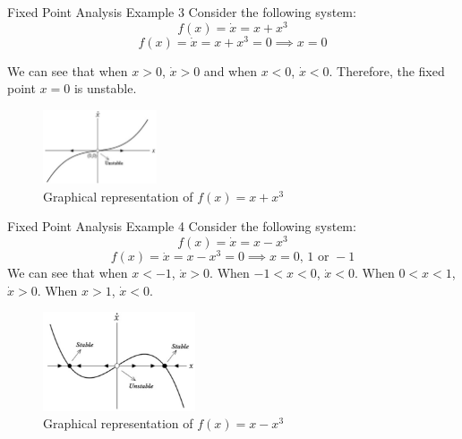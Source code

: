 \documentclass[18pt]{beamer}
\begin{document}
\begin{frame}{Fixed Point Analysis Example 3}
    Consider the following system:
    \[f(x) = \dot{x} = x + x^{3}\]
    \pause{}
    \[f(x) = \dot{x} = x + x^{3} = 0 \implies{x = 0}\]
    \pause{}

    We can see that when $x > 0$, $\dot{x} > 0$ and when $x < 0$, $\dot{x} < 0$. Therefore, the fixed point $x = 0$ is unstable.

    \begin{figure}[t]
        \centering
        \includegraphics[width=0.3\textwidth]{stability2}
        \caption{Graphical representation of $f(x) = x + x^{3}$}
    \end{figure}
\end{frame}

\begin{frame}{Fixed Point Analysis Example 4}
    Consider the following system:
    \[f(x) = \dot{x} = x - x^{3}\]
    \[f(x) = \dot{x} = x - x^{3} = 0 \implies{x = 0 \text{, } 1 \text{ or } -1}\]
    \pause{}
    We can see that when $x < -1$, $\dot{x} > 0$. When $-1 < x < 0$, $\dot{x} < 0$. When $0 < x < 1$, $\dot{x} > 0$. When $x > 1$, $\dot{x} < 0$.
    \begin{figure}[t]
        \centering
        \includegraphics[width=0.4\textwidth]{stability3}
        \caption{Graphical representation of $f(x) = x - x^{3}$}
    \end{figure}
\end{frame}
\end{document}
